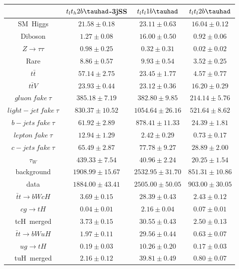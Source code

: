 \centering
\begin{tabular}{|c|c|c|c|} \hline
 & $t_lt_h2b\tauhad$-3jSS & $t_lt_l1b\tauhad$ & $t_lt_l2b\tauhad$\\\hline
SM~Higgs & $21.58\pm0.18$ & $23.11\pm0.63$ & $16.04\pm0.12$\\\hline
Diboson & $1.27\pm0.08$ & $16.00\pm0.50$ & $0.92\pm0.06$\\\hline
$Z\to\tau\tau$ & $0.98\pm0.25$ & $0.32\pm0.31$ & $0.02\pm0.02$\\\hline
Rare & $8.86\pm0.57$ & $9.93\pm0.54$ & $3.52\pm0.25$\\\hline
$t\bar{t}$ & $57.14\pm2.75$ & $23.45\pm1.77$ & $4.57\pm0.77$\\\hline
$t\bar{t}V$ & $23.93\pm0.44$ & $23.12\pm0.36$ & $16.20\pm0.29$\\\hline
$gluon~fake~\tau$ & $385.18\pm7.19$ & $382.80\pm9.85$ & $214.14\pm5.76$\\\hline
$light-jet~fake~\tau$ & $830.37\pm10.52$ & $1054.64\pm26.16$ & $521.64\pm8.62$\\\hline
$b-jets~fake~\tau$ & $61.92\pm2.89$ & $878.41\pm11.33$ & $24.39\pm1.81$\\\hline
$lepton~fake~\tau$ & $12.94\pm1.29$ & $2.42\pm0.29$ & $0.73\pm0.17$\\\hline
$c-jets~fake~\tau$ & $65.49\pm2.87$ & $77.78\pm9.27$ & $28.89\pm2.00$\\\hline
$\tau_{W}$ & $439.33\pm7.54$ & $40.96\pm2.24$ & $20.25\pm1.54$\\\hline
background & $1908.99\pm15.67$ & $2532.95\pm31.70$ & $851.31\pm10.86$\\\hline
data & $1884.00\pm43.41$ & $2505.00\pm50.05$ & $903.00\pm30.05$\\\hline
$\bar{t}t\to bWcH$ & $3.69\pm0.15$ & $28.39\pm0.43$ & $2.43\pm0.12$\\\hline
$cg\to tH$ & $0.04\pm0.01$ & $2.16\pm0.04$ & $0.07\pm0.01$\\\hline
tcH~merged & $3.73\pm0.15$ & $30.55\pm0.43$ & $2.50\pm0.13$\\\hline
$\bar{t}t\to bWuH$ & $1.97\pm0.11$ & $29.56\pm0.44$ & $0.63\pm0.07$\\\hline
$ug\to tH$ & $0.19\pm0.03$ & $10.26\pm0.20$ & $0.17\pm0.03$\\\hline
tuH~merged & $2.16\pm0.12$ & $39.81\pm0.49$ & $0.80\pm0.07$\\\hline
\end{tabular}
